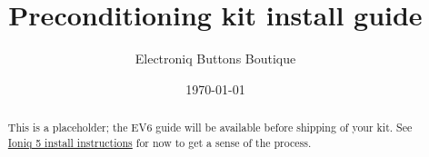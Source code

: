 \documentclass[superscriptaddress,onecolumn,floatfix]{revtex4-2}
\begin{document}
                            
\begin{abstract}
  This is a placeholder; the EV6 guide will be available before shipping of your kit. See \href{https://github.com/tylerharvey/Ioniq5_CAN/blob/main/guides/cars/E-GMP_gen1/Ioniq5/head_unit_preconditioning_kit_install.pdf}{Ioniq 5 install instructions} for now to get a sense of the process.
\end{abstract}
\title{Preconditioning kit install guide}
\author{Electroniq Buttons Boutique}
\date{\today}

\maketitle
\end{document}
